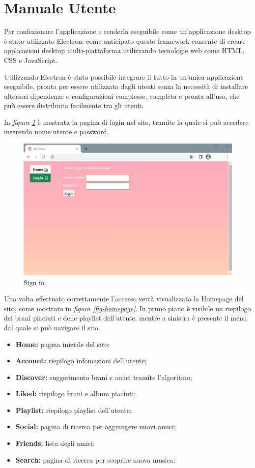 \section{Manuale Utente}
Per confezionare l'applicazione e renderla eseguibile come un'applicazione desktop è 
stato utilizzato Electron: come anticipato questo framework consente di creare applicazioni 
desktop multi-piattaforma utilizzando tecnologie web come HTML, CSS e JavaScript.

Utilizzando Electron è stato possibile integrare il tutto in un'unica applicazione eseguibile, 
pronta per essere utilizzata dagli utenti senza la necessità di installare ulteriori dipendenze o configurazioni complesse, 
completa e pronta all'uso, che può essere distribuita facilmente tra gli utenti.

In \textit{figura \ref{fig-signin}} è mostrata la pagina di login nel sito, tramite la quale si può accedere inserendo
nome utente e password. 
\begin{figure}[H]
    \centering
    \includegraphics[scale=0.4]{images/login_ver2.jpg}
    \caption{Sign in}
    \label{fig-signin}
\end{figure}
\newpage
Una volta effettuato correttamente l'accesso verrà visualizzata la Homepage del sito, come mostrato 
in \textit{figura \ref{fig-homepage}}. In primo piano è visibile un riepilogo dei brani piaciuti e delle playlist dell'utente,
mentre a sinistra è presente il menu dal quale si può navigare il sito. 
\begin{itemize}
    \item \textbf{Home:} pagina iniziale del sito;
    \item \textbf{Account:} riepilogo infomazioni dell'utente;
    \item \textbf{Discover:} suggerimento brani e amici tramite l'algoritmo;
    \item \textbf{Liked:} riepilogo brani e album piaciuti;
    \item \textbf{Playlist:} riepilogo playlist dell'utente;
    \item \textbf{Social:} pagina di ricerca per aggiungere nuovi amici;
    \item \textbf{Friends:} lista degli amici;
    \item \textbf{Search:} pagina di ricerca per scoprire nuova musica;
\end{itemize} 
